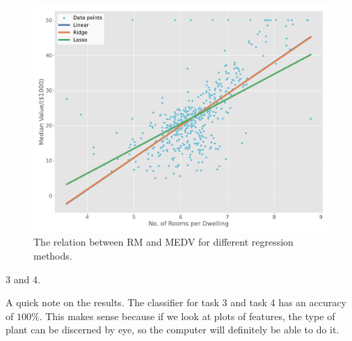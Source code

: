\documentclass[a4paper,12pt]{article}
\begin{document}
\begin{figure}[H]
  \centering
  \includegraphics[scale = 0.4]{Task2/RMvsMEVBivariate.pdf}
  \caption{The relation between RM and MEDV for different regression methods.}
  \label{fig:bivModels}
\end{figure}

3 and 4. 
\begin{minipage}[t]{0.8\dimexpr\textwidth}
  A quick note on the results.
  The classifier for task 3 and task 4 has an accuracy of $100\%$.
  This makes sense because if we look at plots of features, the type of plant can be discerned by eye, so the computer will definitely be able to do it.\\
\end{minipage}
\end{document}
